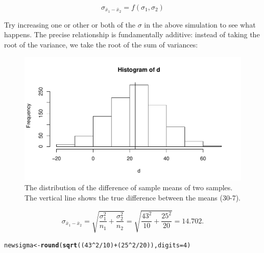 \documentclass[12pt]{book}\usepackage[]{graphicx}\usepackage[]{color}
\makeatletter
\def\maxwidth{ %
  \ifdim\Gin@nat@width>\linewidth
    \linewidth
  \else
    \Gin@nat@width
  \fi
}
\newcommand{\hlnum}[1]{\textcolor[rgb]{0.686,0.059,0.569}{#1}}%
\newcommand{\hlopt}[1]{\textcolor[rgb]{0,0,0}{#1}}%
\newcommand{\hlstd}[1]{\textcolor[rgb]{0.345,0.345,0.345}{#1}}%
\newcommand{\hlkwb}[1]{\textcolor[rgb]{0.69,0.353,0.396}{#1}}%
\newcommand{\hlkwc}[1]{\textcolor[rgb]{0.333,0.667,0.333}{#1}}%
\newcommand{\hlkwd}[1]{\textcolor[rgb]{0.737,0.353,0.396}{\textbf{#1}}}%
\newenvironment{kframe}{%
 \def\at@end@of@kframe{}%
 \ifinner\ifhmode%
  \def\at@end@of@kframe{\end{minipage}}%
  \begin{minipage}{\columnwidth}%
 \fi\fi%
 \def\FrameCommand##1{\hskip\@totalleftmargin \hskip-\fboxsep
 \colorbox{shadecolor}{##1}\hskip-\fboxsep
     \hskip-\linewidth \hskip-\@totalleftmargin \hskip\columnwidth}%
 \MakeFramed {\advance\hsize-\width
   \@totalleftmargin\z@ \linewidth\hsize
   \@setminipage}}%
 {\par\unskip\endMakeFramed%
 \at@end@of@kframe}
\newenvironment{knitrout}{}{} %
\makeatother
\begin{document}
\begin{equation} \sigma_{\bar{x}_1 - \bar{x}_2} = f(\sigma_1,\sigma_2) \end{equation}

Try increasing one or other or both of the $\sigma$ in the above simulation to see what happens. The precise relationship is fundamentally additive: instead of taking the root of the variance, we take the root of the sum of variances:

\begin{figure}[!htbp]
  \centering
\begin{knitrout}
\color{fgcolor}
\includegraphics[width=\maxwidth]{figure/unnamed-chunk-53-1} 

\end{knitrout}
  \caption{The distribution of the difference of sample means of two samples. The vertical line shows the true difference between the means (30-7).}
\end{figure}






\begin{equation}
\sigma_{\bar{x}_1 - \bar{x}_2} 
= \sqrt{\frac{\sigma_1^2}{n_1} + \frac{\sigma_2^2}{n_2}} = \sqrt{\frac{43^2}{10} + \frac{25^2}{20}} = 14.702.
\end{equation}

\begin{knitrout}
\color{fgcolor}\begin{kframe}
\begin{alltt}
\hlstd{newsigma}\hlkwb{<-}\hlkwd{round}\hlstd{(}\hlkwd{sqrt}\hlstd{((}\hlnum{43}\hlopt{^}\hlnum{2}\hlopt{/}\hlnum{10}\hlstd{)}\hlopt{+}\hlstd{(}\hlnum{25}\hlopt{^}\hlnum{2}\hlopt{/}\hlnum{20}\hlstd{)),}\hlkwc{digits}\hlstd{=}\hlnum{4}\hlstd{)}
\end{alltt}
\end{kframe}
\end{knitrout}
\end{document}
